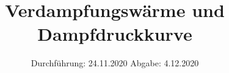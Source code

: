 

\subject{V203}
\title{Verdampfungswärme und Dampfdruckkurve}
\date{%
  Durchführung: 24.11.2020
  \hspace{3em}
  Abgabe: 4.12.2020
}



\maketitle
\thispagestyle{empty}
\tableofcontents
\newpage





%


\nocite{*}
\printbibliography{}


